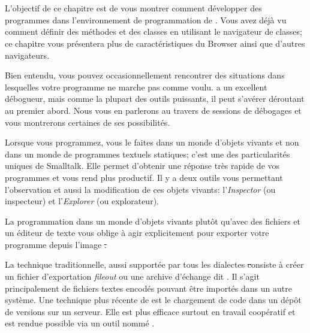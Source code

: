 \documentclass[a4paper,10pt,twoside]{book}
\begin{document}
	\sloppy
\fi

\chapter{\titreEnvironment}



L'objectif de ce chapitre est de vous montrer comment développer des programmes 
dans l'environnement de programmation de \pharo.
Vous avez déjà vu comment définir des méthodes et des classes
en utilisant le navigateur de classes; ce chapitre
vous présentera plus de caractéristiques du Browser ainsi que
d'autres navigateurs. %

Bien entendu, vous pouvez occasionnellement rencontrer
des situations dans lesquelles votre programme ne marche pas comme voulu.
\pharo a un excellent débogueur, mais comme la plupart des outils puissants, il peut s'avérer déroutant au premier abord.
Nous vous en parlerons au travers de sessions de débogages et vous
montrerons certaines de ses possibilités.

Lorsque vous programmez, vous le faites dans un monde d'objets vivants et
non dans un monde de programmes textuels statiques; c'est 
une des particularités uniques de Smalltalk.
Elle permet d'obtenir une réponse très rapide de vos programmes et vous rend plus productif. 
Il y a deux outils vous permettant l'observation et aussi la modification de ces objets 
vivants: l'\emph{Inspector} (ou inspecteur) et l'\emph{Explorer} (ou explorateur).

La programmation dans un monde d'objets vivants plutôt qu'avec des fichiers et un éditeur 
de texte vous oblige à agir explicitement pour exporter votre programme depuis l'image \st.

La technique traditionnelle, aussi supportée par tous les dialectes \st consiste à créer un 
fichier d'exportation \emph{fileout} ou une archive d'échange dit \changeset. Il s'agit 
principalement de fichiers textes encodés pouvant être importés dans un autre système.
Une technique plus récente de \pharo est le chargement de code dans un dépôt de versions sur un serveur.
Elle est plus efficace surtout en travail coopératif et est rendue possible via un outil nommé .
\end{document}

